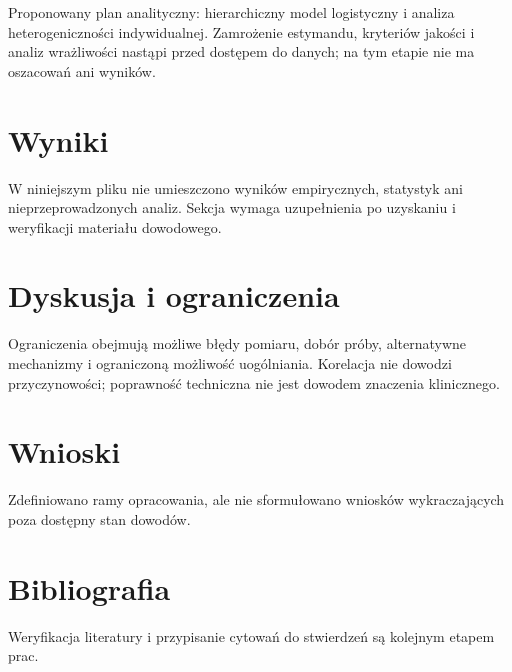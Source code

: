 \documentclass[11pt,a4paper]{article}
\begin{document}
Proponowany plan analityczny: hierarchiczny model logistyczny i analiza heterogeniczności indywidualnej. Zamrożenie estymandu, kryteriów jakości i analiz wrażliwości nastąpi przed dostępem do danych; na tym etapie nie ma oszacowań ani wyników.

\section{Wyniki}

W niniejszym pliku nie umieszczono wyników empirycznych, statystyk ani nieprzeprowadzonych analiz. Sekcja wymaga uzupełnienia po uzyskaniu i weryfikacji materiału dowodowego.

\section{Dyskusja i ograniczenia}

Ograniczenia obejmują możliwe błędy pomiaru, dobór próby, alternatywne mechanizmy i ograniczoną możliwość uogólniania. Korelacja nie dowodzi przyczynowości; poprawność techniczna nie jest dowodem znaczenia klinicznego.

\section{Wnioski}

Zdefiniowano ramy opracowania, ale nie sformułowano wniosków wykraczających poza dostępny stan dowodów.

\section*{Bibliografia}

Weryfikacja literatury i przypisanie cytowań do stwierdzeń są kolejnym etapem prac.
\end{document}
